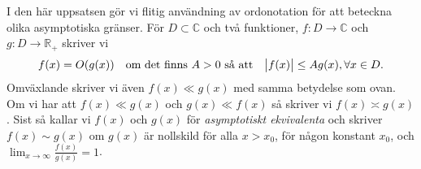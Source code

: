 
I den här uppsatsen gör vi flitig användning av ordonotation för att beteckna olika asymptotiska gränser. För $D \subset \mathbb{C}$ och två funktioner, $f: D \to \mathbb{C}$ och $g: D \to \mathbb{R}_+$ skriver vi
\begin{align*}
    f(x) = O(g(x)) \quad \text{om det finns } A > 0 \text{ så att} \quad \abs{f(x)} \leq A g(x), \forall x \in D.
\end{align*}
Omväxlande skriver vi även \(f(x) \ll g(x)\) med samma betydelse som ovan. Om vi har att \(f(x) \ll g(x)\) och \(g(x) \ll f(x)\) så skriver vi \(f(x) \asymp g(x)\). Sist så kallar vi $f(x)$ och $g(x)$ för \textit{asymptotiskt ekvivalenta} och skriver \(f(x) \sim g(x)\) om $g(x)$ är nollskild för alla \(x > x_0\), för någon konstant \(x_0\), och \(\lim_{x \to \infty} \frac{f(x)}{g(x)} = 1\).


